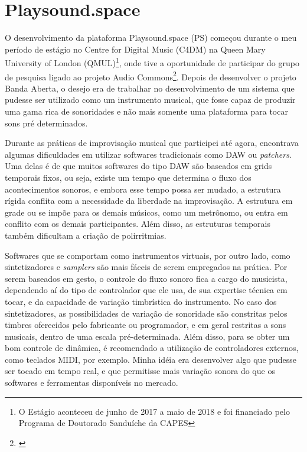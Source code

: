 \section{Playsound.space}

O desenvolvimento da plataforma Playsound.space (PS) começou durante o meu período de estágio no Centre for Digital Music (C4DM) na Queen Mary University of London (QMUL)\footnote{O Estágio aconteceu de junho de 2017 a maio de 2018 e foi financiado pelo Programa de Doutorado Sanduíche da CAPES}, onde tive a oportunidade de participar do grupo de pesquisa ligado ao projeto Audio Commons\footnote{\cite{Font2016}}. Depois de desenvolver o projeto Banda Aberta, o desejo era de trabalhar no desenvolvimento de um sistema que pudesse ser utilizado como um instrumento musical, que fosse capaz de produzir uma gama rica de sonoridades e não mais somente uma plataforma para tocar sons pré determinados. 



Durante as práticas de improvisação musical que participei até agora, encontrava algumas dificuldades em utilizar softwares tradicionais como DAW ou \emph{patchers}. Uma delas é de que muitos softwares do tipo DAW são baseados em grids temporais fixos, ou seja, existe um tempo que determina o fluxo dos acontecimentos sonoros, e embora esse tempo possa ser mudado, a estrutura rígida conflita com a necessidade da liberdade na improvisação. A estrutura em grade ou se impõe para os demais músicos, como um metrônomo, ou entra em conflito com os demais participantes. Além disso, as estruturas temporais também dificultam a criação de polirritmias. 


Softwares que se comportam como instrumentos virtuais, por outro lado, como sintetizadores e \emph{samplers} são mais fáceis de serem empregados na prática. Por serem baseados em gesto, o controle do fluxo sonoro fica a cargo do musicista, dependendo aí do tipo de controlador que ele usa, de sua expertise técnica em tocar, e da capacidade de variação timbrística do instrumento. No caso dos sintetizadores, as possibilidades de variação de sonoridade são constritas pelos timbres oferecidos pelo fabricante ou programador, e em geral restritas a sons musicais, dentro de uma escala pré-determinada. Além disso, para se obter um bom controle de dinâmica, é recomendado a utilização de controladores externos, como teclados MIDI, por exemplo. Minha idéia era desenvolver algo que pudesse ser tocado em tempo real, e que permitisse mais variação sonora do que os softwares e ferramentas disponíveis no mercado.

